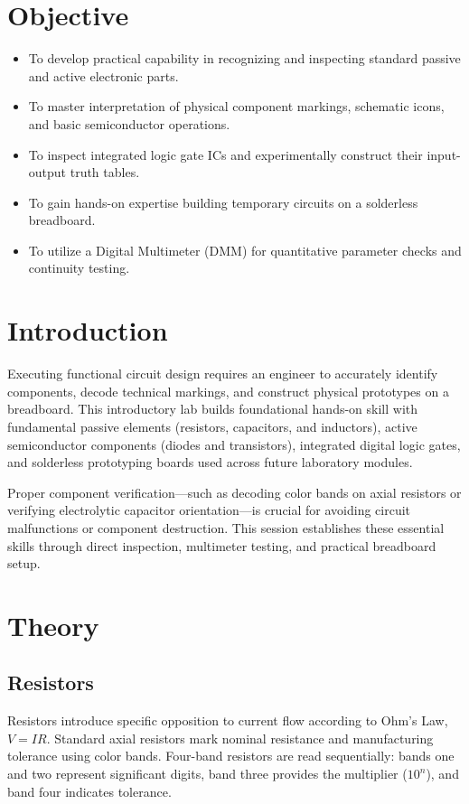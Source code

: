 \section{Objective}
\begin{itemize}
	\item To develop practical capability in recognizing and inspecting standard passive and active electronic parts.
	\item To master interpretation of physical component markings, schematic icons, and basic semiconductor operations.
	\item To inspect integrated logic gate ICs and experimentally construct their input-output truth tables.
	\item To gain hands-on expertise building temporary circuits on a solderless breadboard.
	\item To utilize a Digital Multimeter (DMM) for quantitative parameter checks and continuity testing.
\end{itemize}

\section{Introduction}
Executing functional circuit design requires an engineer to accurately identify components, decode technical markings, and construct physical prototypes on a breadboard. This introductory lab builds foundational hands-on skill with fundamental passive elements (resistors, capacitors, and inductors), active semiconductor components (diodes and transistors), integrated digital logic gates, and solderless prototyping boards used across future laboratory modules.

Proper component verification—such as decoding color bands on axial resistors or verifying electrolytic capacitor orientation—is crucial for avoiding circuit malfunctions or component destruction. This session establishes these essential skills through direct inspection, multimeter testing, and practical breadboard setup.

\section{Theory}

\subsection{Resistors}
Resistors introduce specific opposition to current flow according to Ohm's Law, $V = IR$. Standard axial resistors mark nominal resistance and manufacturing tolerance using color bands. Four-band resistors are read sequentially: bands one and two represent significant digits, band three provides the multiplier ($10^{n}$), and band four indicates tolerance.

